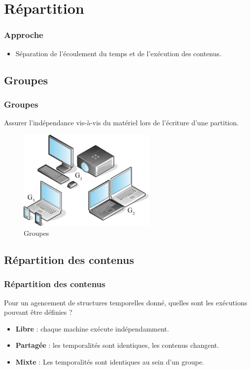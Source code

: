 \documentclass[]{beamer}
\begin{document}
\section{Répartition}
\begin{frame}
\frametitle{Approche}
\begin{itemize}
    \item Séparation de l'écoulement du temps et de l'exécution des contenus.
\end{itemize}
\end{frame}

\subsection{Groupes}
\begin{frame}
\frametitle{Groupes}
{\Large Assurer l'indépendance vis-à-vis du matériel lors de l'écriture d'une partition.}
\begin{figure}
	\centering
	\includegraphics[width=0.6\textwidth]{images/groupes.eps}
	\caption{Groupes}
\end{figure}
\end{frame}


\subsection{Répartition des contenus}
\begin{frame}
\frametitle{Répartition des contenus}
{\Large Pour un agencement de structures temporelles donné, quelles sont les exécutions pouvant être définies ?}

\begin{itemize}
    \item<1> \textbf{Libre} : chaque machine exécute indépendamment.
    \item<1> \textbf{Partagée} : les temporalités sont identiques, les contenus changent.
    \item<1> \textbf{Mixte} : Les temporalités sont identiques au sein d'un groupe.
\end{itemize}
\end{frame}
\end{document}
